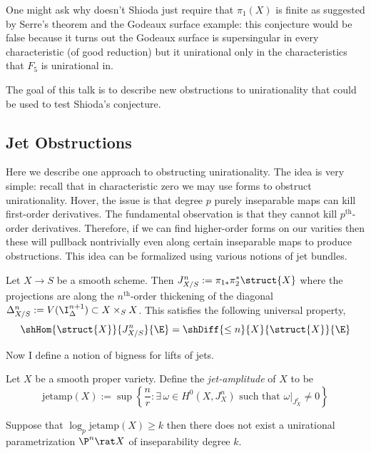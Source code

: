 \documentclass[12pt]{article}
\begin{document}
\begin{rmk}
One might ask why doesn't Shioda just require that $\pi_1(X)$ is finite as suggested by Serre's theorem and the Godeaux surface example: this conjecture would be false because it turns out the Godeaux surface is supersingular in every characteristic (of good reduction) but it unirational only in the characteristics that $F_5$ is unirational in.
\end{rmk}

The goal of this talk is to describe new obstructions to unirationality that could be used to test Shioda's conjecture.

\subsection{Jet Obstructions}


Here we describe one approach to obstructing unirationality. The idea is very simple: recall that in characteristic zero we may use forms to obstruct unirationality. Hover, the issue is that degree $p$ purely inseparable maps can kill first-order derivatives. The fundamental observation is that they cannot kill $p^{\text{th}}$-order derivatives. Therefore, if we can find higher-order forms on our varities then these will pullback nontrivially even along certain inseparable maps to produce obstructions. This idea can be formalized using various notions of jet bundles.

\begin{defn}
Let $X \to S$ be a smooth scheme. Then $J^n_{X/S} := \pi_{1*} \pi_2^* \struct{X}$ where the projections are along the $n^{\text{th}}$-order thickening of the diagonal $\Delta^n_{X/S} := V(\I_{\Delta}^{n+1}) \subset X \times_S X$. This satisfies the following universal property,
\[ \shHom{\struct{X}}{J^n_{X/S}}{\E} = \shDiff{\le n}{X}{\struct{X}}{\E} \]
\end{defn}

Now I define a notion of bigness for lifts of jets.

\newcommand{\jetamp}{\mathrm{jetamp}}

\begin{defn}
Let $X$ be a smooth proper variety. Define the \textit{jet-amplitude} of $X$ to be
\[ \jetamp(X) := \sup \left \{ \frac{n}{r} : \exists \, \omega \in H^0(X, J^{n}_X) \text{ such that } \omega|_{J^{r}_X} \neq 0 \right\} \]
\end{defn}

\begin{theorem}[C]
Suppose that $\log_p \jetamp(X) \ge k$ then there does not exist a unirational parametrization $\P^n \rat X$ of inseparability degree $k$.
\end{theorem}
\end{document}
